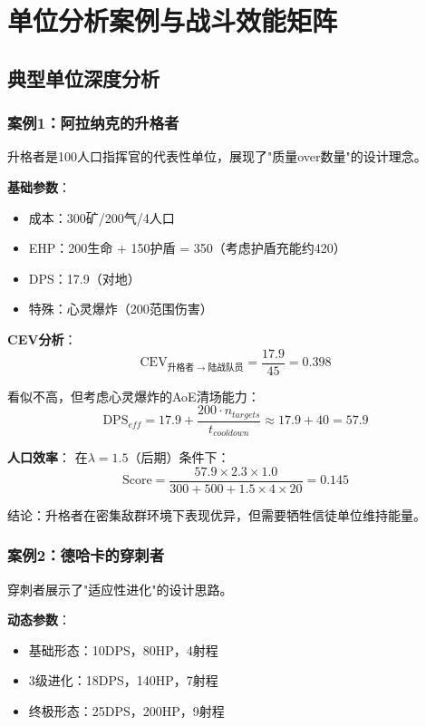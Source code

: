 \documentclass[a4paper,12pt]{article}
\begin{document}
\section{单位分析案例与战斗效能矩阵}

\subsection{典型单位深度分析}

\subsubsection{案例1：阿拉纳克的升格者}
升格者是100人口指挥官的代表性单位，展现了"质量over数量"的设计理念。

\textbf{基础参数}：
\begin{itemize}
\item 成本：300矿/200气/4人口
\item EHP：200生命 + 150护盾 = 350（考虑护盾充能约420）
\item DPS：17.9（对地）
\item 特殊：心灵爆炸（200范围伤害）
\end{itemize}

\textbf{CEV分析}：
\begin{equation}
\text{CEV}_{升格者 \rightarrow 陆战队员} = \frac{17.9}{45} = 0.398
\end{equation}

看似不高，但考虑心灵爆炸的AoE清场能力：
\begin{equation}
\text{DPS}_{eff} = 17.9 + \frac{200 \cdot n_{targets}}{t_{cooldown}} \approx 17.9 + 40 = 57.9
\end{equation}

\textbf{人口效率}：
在$\lambda = 1.5$（后期）条件下：
\begin{equation}
\text{Score} = \frac{57.9 \times 2.3 \times 1.0}{300 + 500 + 1.5 \times 4 \times 20} = 0.145
\end{equation}

结论：升格者在密集敌群环境下表现优异，但需要牺牲信徒单位维持能量。

\subsubsection{案例2：德哈卡的穿刺者}
穿刺者展示了"适应性进化"的设计思路。

\textbf{动态参数}：
\begin{itemize}
\item 基础形态：10DPS，80HP，4射程
\item 3级进化：18DPS，140HP，7射程
\item 终极形态：25DPS，200HP，9射程
\end{itemize}
\end{document}

